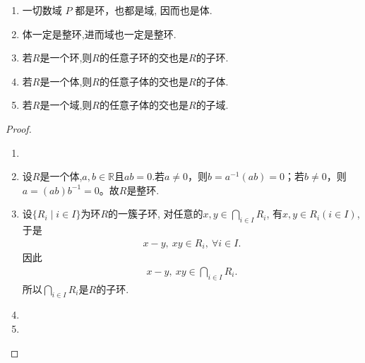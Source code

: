 \documentclass[../../main.tex]{subfiles}%
\begin{document}
\begin{proposition}\label{proposition:域和体的一些显然的性质}
\begin{enumerate}[(1)]
\item 一切数域 \( P \) 都是环，也都是域, 因而也是体.

\item\label{proposition:域和体的一些显然的性质-1} 体一定是整环,进而域也一定是整环.

\item\label{proposition:域和体的一些显然的性质-4} 若$R$是一个环,则$R$的任意子环的交也是$R$的子环.

\item\label{proposition:域和体的一些显然的性质-2} 若$R$是一个体,则$R$的任意子体的交也是$R$的子体.

\item\label{proposition:域和体的一些显然的性质-3} 若$R$是一个域,则$R$的任意子体的交也是$R$的子域.
\end{enumerate}
\end{proposition}
\begin{proof}
\begin{enumerate}[(1)]
\item 

\item 设$R$是一个体,$a,b\in \mathbb{R}$且$ab=0$.若$a\neq 0$，则$b=a^{-1}(ab)=0$；若$b\neq 0$，则$a=(ab)b^{-1}=0$。故$R$是整环.

\item 设$\{R_i \mid i \in I\}$为环$R$的一簇子环, 对任意的$x,y \in \bigcap_{i \in I}R_i$, 有$x,y \in R_i(i \in I)$, 于是
\begin{align*}
x - y,\ xy \in R_i,\ \forall i \in I.
\end{align*}
因此
\begin{align*}
x - y,\ xy \in \bigcap_{i \in I}R_i.
\end{align*}
所以$\bigcap_{i \in I}R_i$是$R$的子环.

\item 

\item 
\end{enumerate}
\end{proof}
\end{document}

